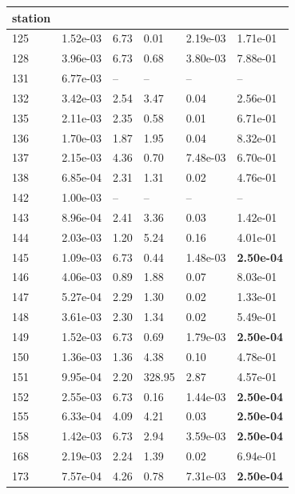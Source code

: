 \begin{figure}[htbp!]
{\begin{minipage}[t]{0.48\linewidth}
\begin{tabular}{llllll}
        station &  &  &  &  &  \\
        \midrule
                    125 & 1.52e-03 & 6.73 & 0.01 & 2.19e-03 & 1.71e-01\\
                    128 & 3.96e-03 & 6.73 & 0.68 & 3.80e-03 & 7.88e-01\\
                    131 & 6.77e-03 & -- & -- & -- & --\\
                    132 & 3.42e-03 & 2.54 & 3.47 & 0.04 & 2.56e-01\\
                    135 & 2.11e-03 & 2.35 & 0.58 & 0.01 & 6.71e-01\\
                    136 & 1.70e-03 & 1.87 & 1.95 & 0.04 & 8.32e-01\\
                    137 & 2.15e-03 & 4.36 & 0.70 & 7.48e-03 & 6.70e-01\\
                    138 & 6.85e-04 & 2.31 & 1.31 & 0.02 & 4.76e-01\\
                    142 & 1.00e-03 & -- & -- & -- & --\\
                    143 & 8.96e-04 & 2.41 & 3.36 & 0.03 & 1.42e-01\\
                    144 & 2.03e-03 & 1.20 & 5.24 & 0.16 & 4.01e-01\\
                    145 & 1.09e-03 & 6.73 & 0.44 & 1.48e-03 & \textbf{2.50e-04}\\
                    146 & 4.06e-03 & 0.89 & 1.88 & 0.07 & 8.03e-01\\
                    147 & 5.27e-04 & 2.29 & 1.30 & 0.02 & 1.33e-01\\
                    148 & 3.61e-03 & 2.30 & 1.34 & 0.02 & 5.49e-01\\
                    149 & 1.52e-03 & 6.73 & 0.69 & 1.79e-03 & \textbf{2.50e-04}\\
                    150 & 1.36e-03 & 1.36 & 4.38 & 0.10 & 4.78e-01\\
                    151 & 9.95e-04 & 2.20 & 328.95 & 2.87 & 4.57e-01\\
                    152 & 2.55e-03 & 6.73 & 0.16 & 1.44e-03 & \textbf{2.50e-04}\\
                    155 & 6.33e-04 & 4.09 & 4.21 & 0.03 & \textbf{2.50e-04}\\
                    158 & 1.42e-03 & 6.73 & 2.94 & 3.59e-03 & \textbf{2.50e-04}\\
                    168 & 2.19e-03 & 2.24 & 1.39 & 0.02 & 6.94e-01\\
                    173 & 7.57e-04 & 4.26 & 0.78 & 7.31e-03 & \textbf{2.50e-04}\\

\end{tabular}
\end{minipage}}
\end{figure}
